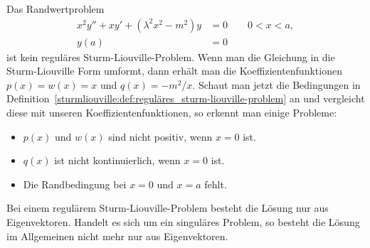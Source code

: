 \begin{beispiel}
	Das Randwertproblem
	\begin{equation}
		\begin{aligned}
		x^2y'' + xy' + (\lambda^2x^2 - m^2)y &= 0 \qquad 0<x<a,\\
		y(a) &= 0
		\end{aligned}
	\end{equation}
	ist kein reguläres Sturm-Liouville-Problem.
	Wenn man die Gleichung in die Sturm-Liouville Form umformt, dann
	erhält man
	die Koeffizientenfunktionen $p(x) = w(x) = x$ und $q(x) = -m^2/x$.
	Schaut man jetzt die Bedingungen in
	Definition~\ref{sturmliouville:def:reguläres_sturm-liouville-problem} an und 
	vergleicht diese mit unseren Koeffizientenfunktionen, so erkennt man einige
	Probleme:
	\begin{itemize}
		\item $p(x)$ und $w(x)$ sind nicht positiv, wenn $x = 0$ ist.
		\item $q(x)$ ist nicht kontinuierlich, wenn $x = 0$ ist.
		\item Die Randbedingung bei $x = 0$ und $x = a$ fehlt.
\qedhere
	\end{itemize}
\end{beispiel}

Bei einem regulärem Sturm-Liouville-Problem besteht die Lösung nur aus
Eigenvektoren.
Handelt es sich um ein singuläres Problem, so besteht die Lösung im Allgemeinen
nicht mehr nur aus Eigenvektoren.
 
